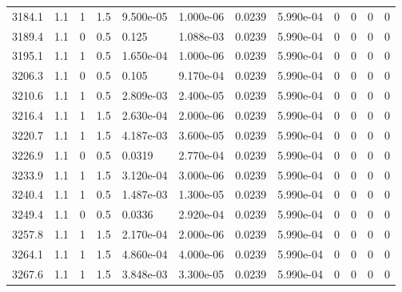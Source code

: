 \documentclass[preview]{standalone}
\begin{document}
{{{{{{{{{{{{{\begin{tabular}{L{1.2cm}C{1.2cm} C{0.3cm}C{0.5cm} C{1.4cm}C{1.4cm} C{1.4cm}C{1.4cm} C{1.6cm}C{1.6cm} C{1.6cm}C{1.6cm}}
  3184.1  &   1.1  & 1     & 1.5 &  9.500e-05  & 1.000e-06  &  0.0239&   5.990e-04& 0 & 0   &  0 & 0  \\ 
  3189.4  &   1.1  & 0     & 0.5 &  0.125  & 1.088e-03  &  0.0239&   5.990e-04& 0 & 0   &  0 & 0  \\ 
  3195.1  &   1.1  & 1     & 0.5 &  1.650e-04  & 1.000e-06  &  0.0239&   5.990e-04& 0 & 0   &  0 & 0  \\ 
  3206.3  &   1.1  & 0     & 0.5 &  0.105  & 9.170e-04  &  0.0239&   5.990e-04& 0 & 0   &  0 & 0  \\ 
  3210.6  &   1.1  & 1     & 0.5 &  2.809e-03  & 2.400e-05  &  0.0239&   5.990e-04& 0 & 0   &  0 & 0  \\ 
  3216.4  &   1.1  & 1     & 1.5 &  2.630e-04  & 2.000e-06  &  0.0239&   5.990e-04& 0 & 0   &  0 & 0  \\ 
  3220.7  &   1.1  & 1     & 1.5 &  4.187e-03  & 3.600e-05  &  0.0239&   5.990e-04& 0 & 0   &  0 & 0  \\ 
  3226.9  &   1.1  & 0     & 0.5 &  0.0319  & 2.770e-04  &  0.0239&   5.990e-04& 0 & 0   &  0 & 0  \\ 
  3233.9  &   1.1  & 1     & 1.5 &  3.120e-04  & 3.000e-06  &  0.0239&   5.990e-04& 0 & 0   &  0 & 0  \\ 
  3240.4  &   1.1  & 1     & 0.5 &  1.487e-03  & 1.300e-05  &  0.0239&   5.990e-04& 0 & 0   &  0 & 0  \\ 
  3249.4  &   1.1  & 0     & 0.5 &  0.0336  & 2.920e-04  &  0.0239&   5.990e-04& 0 & 0   &  0 & 0  \\ 
  3257.8  &   1.1  & 1     & 1.5 &  2.170e-04  & 2.000e-06  &  0.0239&   5.990e-04& 0 & 0   &  0 & 0  \\ 
  3264.1  &   1.1  & 1     & 1.5 &  4.860e-04  & 4.000e-06  &  0.0239&   5.990e-04& 0 & 0   &  0 & 0  \\ 
  3267.6  &   1.1  & 1     & 1.5 &  3.848e-03  & 3.300e-05  &  0.0239&   5.990e-04& 0 & 0   &  0 & 0  \\ 
\hline 
\end{tabular} 

}}}}}}}}}}}}}
\end{document}
